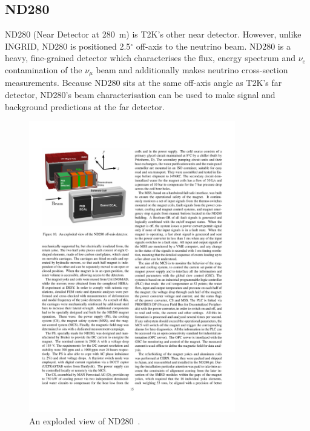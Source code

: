 \subsection{ND280}
\label{subsec:ND280}
ND280 (Near Detector at 280~m) is T2K's other near detector.  However, unlike INGRID, ND280 is positioned 2.5$^\circ$ off-axis to the neutrino beam.  ND280 is a heavy, fine-grained detector  which characterises the flux, energy spectrum and $\nu_e$ contamination of the $\nu_\mu$ beam and additionally makes neutrino cross-section measurements.  Because ND280 sits at the same off-axis angle as T2K's far detector, ND280's beam characterisation can be used to make signal and background predictions at the far detector.
\begin{figure}
  \centering
  \includegraphics[width=9cm]{images/t2k/ND280Schematic.pdf}
  \caption{An exploded view of ND280~\cite{Abe2011106}.}
  \label{fig:ND280Schematic}
\end{figure}
\newline
\newline
